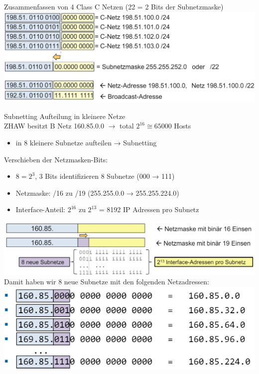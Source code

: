 \begin{example}
    Zusammenfassen von 4 Class C Netzen (22 = 2 Bits der Subnetzmaske)\\
        \includegraphics[width=0.95\linewidth]{images/example_supernetting.png}
\end{example}

\begin{concept}{Subnetting}
    Aufteilung in kleinere Netze\\
    ZHAW besitzt B Netz 160.85.0.0 $\rightarrow$ total $2^{16} \cong 65000$  Hosts
    \begin{itemize}
        \item in 8 kleinere Subnetze aufteilen → Subnetting
    \end{itemize}
    Verschieben der Netzmasken-Bits: 
    \begin{itemize}
        \item $8 = 2^3$, 3 Bits identifizieren 8 Subnetze (000 → 111)
        \item Netzmaske: /16 zu /19 (255.255.0.0 → 255.255.224.0)
        \item Interface-Anteil: $2^{16}$ zu $2^{13}$ = 8192 IP Adressen pro Subnetz
    \end{itemize}
        \includegraphics[width=0.9\linewidth]{images/subnetting1.png}\\
    Damit haben wir 8 neue Subnetze mit den folgenden Netzadressen:\\
        \includegraphics[width=0.7\linewidth]{images/subnetting2.png}

\end{concept}

